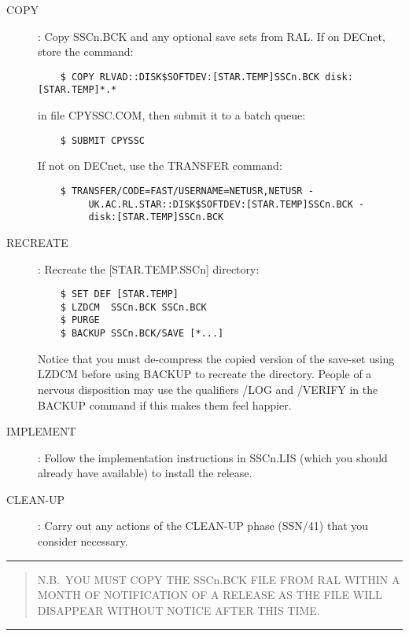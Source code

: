 \begin{description}

\item [COPY]: Copy SSCn.BCK and any optional save sets from RAL.
If on DECnet, store the command:
\begin{verbatim}
    $ COPY RLVAD::DISK$SOFTDEV:[STAR.TEMP]SSCn.BCK disk:[STAR.TEMP]*.*
\end{verbatim}
in file CPYSSC.COM, then submit it to a batch queue:
\begin{verbatim}
    $ SUBMIT CPYSSC
\end{verbatim}
If not on DECnet, use the TRANSFER command:
\begin{verbatim}
    $ TRANSFER/CODE=FAST/USERNAME=NETUSR,NETUSR -
         UK.AC.RL.STAR::DISK$SOFTDEV:[STAR.TEMP]SSCn.BCK -
         disk:[STAR.TEMP]SSCn.BCK
\end{verbatim}

\item [RECREATE]: Recreate the [STAR.TEMP.SSCn] directory:
\begin{verbatim}
    $ SET DEF [STAR.TEMP]
    $ LZDCM  SSCn.BCK SSCn.BCK
    $ PURGE
    $ BACKUP SSCn.BCK/SAVE [*...]
\end{verbatim}
Notice that you must de-compress the copied version of the save-set using
LZDCM before using BACKUP to recreate the directory.
People of a nervous disposition may use the qualifiers /LOG and /VERIFY in the
BACKUP command if this makes them feel happier.

\item [IMPLEMENT]: Follow the implementation instructions in SSCn.LIS (which you
should already have available) to install the release.

\item [CLEAN-UP]: Carry out any actions of the CLEAN-UP phase (SSN/41) that you
consider necessary.
\end{description}

\rule{\textwidth}{0.3mm}
\begin{quote}
N.B.\ YOU MUST COPY THE SSCn.BCK FILE FROM RAL WITHIN A MONTH OF NOTIFICATION
OF A RELEASE AS THE FILE WILL DISAPPEAR WITHOUT NOTICE AFTER THIS TIME.
\end{quote}
\rule{\textwidth}{0.3mm}


